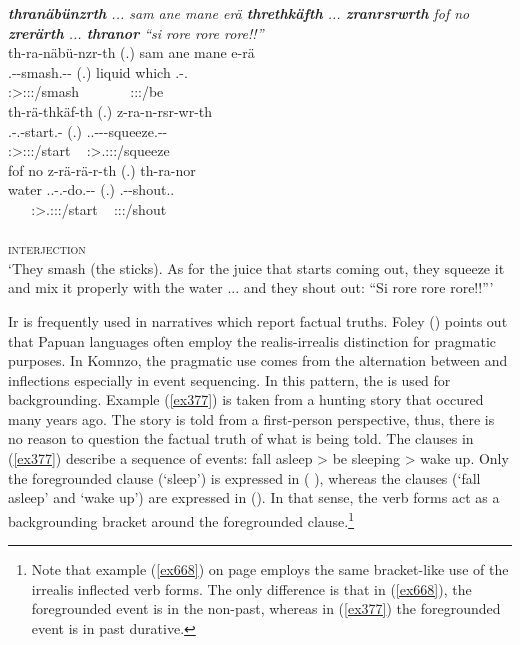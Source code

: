 \begin{exe}
	\ex \emph{\textbf{thranäbünzrth} ... sam ane mane erä \textbf{threthkäfth} ... \textbf{zranrsrwrth} fof no \textbf{zrerärth} ... \textbf{thranor} ``si rore rore rore!!''}\\
	\glll th-ra-näbü-nzr-th (.) sam ane mane e-rä\\
	\Stnsg.\Bet-\Irr-smash.\Ext-\Ndu-\Stnsg{} (.) liquid {\Dem} which \Stnsg.\Alph-\Cop.{\Ndu}\\
	{\footnotesize \Stpl:\Sbj>\Stpl:\Obj:\Irr:\Ipfv/smash} ~ ~ ~ ~ {\footnotesize \Stpl:\Sbj:\Nonpast:\Ipfv/be}\\
	\sn
	\glll th-rä-thkäf-th (.) z-ra-n-rsr-wr-th\\
	\Stnsg.\Bet-\Irr.\Ndu-start.\Rs-\Stnsg{} (.) \Tsg.\F.\Bet-\Irr-\Venit-squeeze.\Ext-\Ndu-\Stnsg{}\\
	{\footnotesize \Stpl:\Sbj>\Stpl:\Obj:\Irr:\Pfv/start} ~  {\footnotesize \Stpl:\Sbj>\Tsg.\F:\Obj:\Irr:\Ipfv/squeeze}\\
	\sn
	\glll
	fof no z-rä-rä-r-th (.) th-ra-nor\\
	{\Emph} water \Tsg.\F.\Bet-\Irr.\Vc-do.\Ext-\Ndu-\Stnsg{} (.) \Stnsg.\Bet-\Irr-shout.\Ext.{\Ndu}\\
	 ~ ~ {\footnotesize \Stpl:\Sbj>\Tsg.\F:\Io:\Irr:\Ipfv/start} ~ {\footnotesize \Stpl:\Sbj:\Irr:\Ipfv/shout}\\
	\sn
	\\
	{\textsc{interjection}}\\
	\trans `They smash (the sticks). As for the juice that starts coming out, they squeeze it and mix it properly with the water ... and they shout out: ``Si rore rore rore!!''' 
	\label{ex426}
\end{exe}

Ir  is frequently used in narratives which report factual truths. Foley (\citeyear[389]{Foley:2000uh}) points out that Papuan languages often employ the realis-irrealis distinction for pragmatic purposes. In Komnzo, the pragmatic use comes from the alternation between  and  inflections especially in event sequencing. In this pattern, the  is used for backgrounding. Example (\ref{ex377}) is taken from a hunting story that occured many years ago. The story is told from a first-person perspective, thus, there is no reason to question the factual truth of what is being told. The clauses in (\ref{ex377}) describe a sequence of events: fall asleep > be sleeping > wake up. Only the foregrounded clause (`sleep') is expressed in  ( ), whereas the  clauses (`fall asleep' and `wake up') are expressed in  (). In that sense, the  verb forms act as a backgrounding bracket around the foregrounded clause.\footnote{Note that example (\ref{ex668}) on page \pageref{ex668} employs the same bracket-like use of the irrealis inflected verb forms. The only difference is that in (\ref{ex668}), the foregrounded event is in the non-past, whereas in (\ref{ex377}) the foregrounded event is in past durative.}

